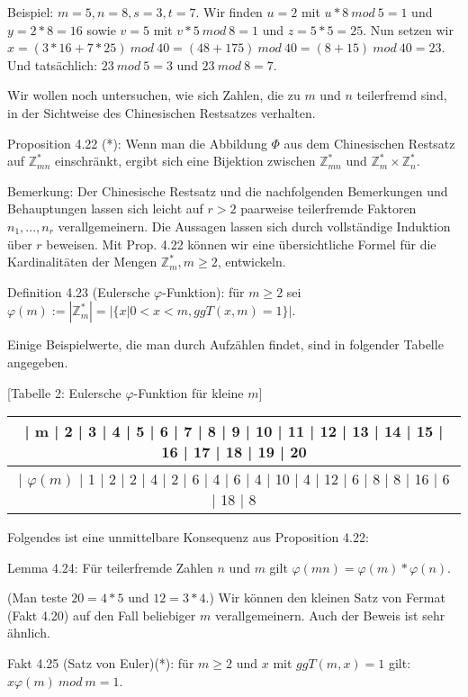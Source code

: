\documentclass[a4paper]{article}
\begin{document}
\begin{multicols}{3}
    Beispiel: $m=5,n=8,s=3,t=7$. Wir finden $u=2$ mit $u*8\ mod\ 5 = 1$ und $y= 2*8=16$ sowie $v=5$ mit $v*5\ mod\ 8=1$ und $z=5*5=25$. Nun setzen wir $x=(3*16+7*25) \ mod\ 40=(48+175)\ mod\ 40 = (8 + 15)\ mod\ 40 = 23$. Und tatsächlich: $23\ mod\ 5 = 3$ und $23\ mod\ 8 = 7$.

    Wir wollen noch untersuchen, wie sich Zahlen, die zu $m$ und $n$ teilerfremd sind, in der Sichtweise des Chinesischen Restsatzes verhalten.

    Proposition 4.22 (*): Wenn man die Abbildung $\Phi$ aus dem Chinesischen Restsatz auf $\mathbb{Z}^*_{mn}$ einschränkt, ergibt sich eine Bijektion zwischen $\mathbb{Z}^*_{mn}$ und $\mathbb{Z}^*_m\times\mathbb{Z}^*_n$.

    Bemerkung: Der Chinesische Restsatz und die nachfolgenden Bemerkungen und Behauptungen lassen sich leicht auf $r>2$ paarweise teilerfremde Faktoren $n_1,...,n_r$
    verallgemeinern. Die Aussagen lassen sich durch vollständige Induktion über $r$ beweisen. Mit Prop. 4.22 können wir eine übersichtliche Formel für die Kardinalitäten der Mengen $\mathbb{Z}^*_m, m\geq 2$, entwickeln.

    Definition 4.23 (Eulersche $\varphi$-Funktion): für $m\geq 2$ sei $\varphi(m):=|\mathbb{Z}^*_m| =|\{x| 0<x<m,ggT(x,m) = 1\}|$.

    Einige Beispielwerte, die man durch Aufzählen findet, sind in folgender Tabelle angegeben.

        [Tabelle 2: Eulersche $\varphi$-Funktion für kleine $m$]
        \begin{tabular}{c}
    | m  | 2  | 3  | 4  | 5  | 6  | 7  | 8  | 9  | 10 | 11 | 12 | 13 | 14 | 15 | 16 | 17 | 18 | 19 | 20 \\\hline
    | $\varphi(m)$ | 1  | 2  | 2  | 4  | 2  | 6  | 4  | 6  | 4  | 10 | 4  | 12 | 6  | 8  | 8  | 16 | 6  | 18 | 8  
        \end{tabular}

    Folgendes ist eine unmittelbare Konsequenz aus Proposition 4.22:

    Lemma 4.24: Für teilerfremde Zahlen $n$ und $m$ gilt $\varphi(mn)=\varphi(m)*\varphi(n)$.

    (Man teste $20=4*5$ und $12=3*4$.)
    Wir können den kleinen Satz von Fermat (Fakt 4.20) auf den Fall beliebiger $m$ verallgemeinern. Auch der Beweis ist sehr ähnlich.

    Fakt 4.25 (Satz von Euler)(*): für $m\geq 2$ und $x$ mit $ggT(m,x) = 1$ gilt: $x\varphi(m)\ mod\ m=1$.


\end{multicols}
\end{document}
